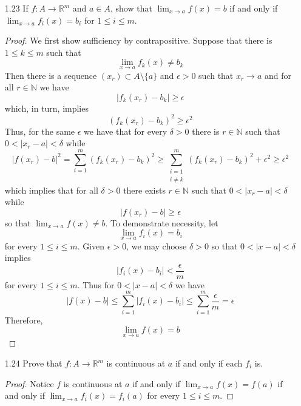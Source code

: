 \begin{enumerate}
    \item[1.23] If \( f: A \rightarrow \mathbb{R}^m \) and \( a \in A \), show that \( \lim_{x \rightarrow a} f(x) =b \) if and only if \( \lim_{x \rightarrow a} f_i(x)=b_i \) for \( 1 \leq i \leq m \).
    
    \begin{proof}
    We first show sufficiency by contrapositive. Suppose that there is \( 1 \leq k \leq m \) such that
    \[
    \lim_{x \rightarrow a} f_k(x) \neq b_k
    \]
    Then there is a sequence \( (x_r) \subset A \setminus \{ a \} \) and \( \epsilon > 0 \) such that \( x_r \rightarrow a \) and for all \( r \in \mathbb{N} \) we have
    \[
    \left| f_k(x_r)-b_k \right| \geq \epsilon
    \]
    which, in turn, implies
    \[
    (f_k(x_r)-b_k)^2 \geq \epsilon^2
    \]
    Thus, for the same \( \epsilon \) we have that for every \( \delta > 0 \) there is \( r \in \mathbb{N} \) such that \( 0 < \left| x_r - a \right| < \delta \) while
    \[
    \left| f(x_r) - b \right|^2 = \sum_{i=1}^m (f_k(x_r)-b_k)^2 \geq \sum_{\substack{i=1 \\ i\neq k}}^m (f_k(x_r)-b_k)^2 + \epsilon^2 \geq \epsilon^2
    \]
    which implies that for all \( \delta > 0 \) there exists \( r \in \mathbb{N} \) such that \( 0 < \left| x_r - a \right| < \delta \) while
    \[
    \left| f(x_r) - b \right| \geq \epsilon
    \]
    so that \( \lim_{x \rightarrow a} f(x) \neq b \). To demonstrate necessity, let 
    \[
    \lim_{x\rightarrow a} f_i(x) = b_i
    \]
    for every \( 1 \leq i \leq m \). Given \( \epsilon > 0 \), we may choose \( \delta > 0 \) so that \( 0 < \left| x-a \right| < \delta \) implies
    \[
    \left| f_i(x)-b_i \right| < \frac{\epsilon}{m}
    \]
    for every \( 1 \leq i \leq m \). Thus for \( 0 < \left| x-a \right| < \delta \) we have
    \[
    \left| f(x) - b \right| \leq \sum_{i=1}^m \left| f_i(x)-b_i \right| \leq \sum_{i=1}^m \frac{\epsilon}{m} = \epsilon
    \]
    Therefore,
    \[
    \lim_{x\rightarrow a} f(x) = b
    \]
    \end{proof}
    
    \item[1.24] Prove that \( f: A \rightarrow \mathbb{R}^m \) is continuous at \( a \) if and only if each \( f_i \) is.
    
    \begin{proof}
    Notice \( f \) is continuous at \( a \) if and only if \( \lim_{x \rightarrow a} f(x) = f(a) \) if and only if \( \lim_{x \rightarrow a} f_i(x) = f_i(a) \) for every \( 1 \leq i \leq m \). 
    \end{proof}
    

\end{enumerate}
